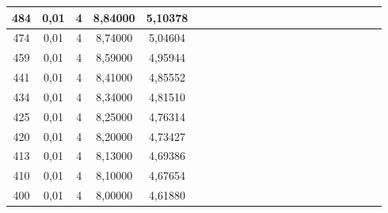 \documentclass[10pt,a4paper]{article}
\begin{document}
\begin{center}
\begin{center}
\begin{table}[h!]
\begin{tabular}{|c|c|c|c|c|c|c|c|c|c|c|c|c|c|c|c|c|c|c|c|c|c|}
484  & 0,01  & 4   & 8,84000 & 5,10378 \\ \hline
474  & 0,01  & 4   & 8,74000 & 5,04604 \\ \hline
459  & 0,01  & 4   & 8,59000 & 4,95944 \\ \hline
441  & 0,01  & 4   & 8,41000 & 4,85552 \\ \hline
434  & 0,01  & 4   & 8,34000 & 4,81510 \\ \hline
425  & 0,01  & 4   & 8,25000 & 4,76314 \\ \hline
420  & 0,01  & 4   & 8,20000 & 4,73427 \\ \hline
413  & 0,01  & 4   & 8,13000 & 4,69386 \\ \hline
410  & 0,01  & 4   & 8,10000 & 4,67654 \\ \hline
400  & 0,01  & 4   & 8,00000 & 4,61880 \\ \hline
 \end{tabular}
 \end{table}
 \end{center}
 

\end{center}
\end{document}
